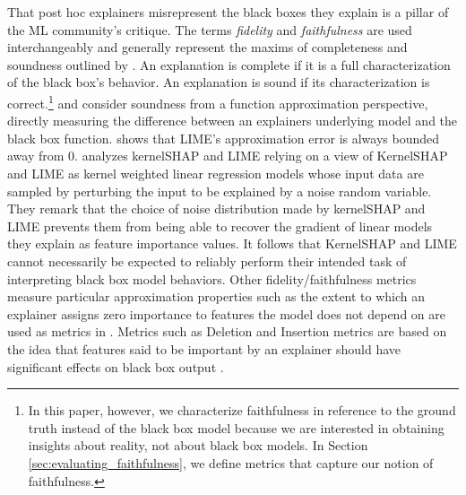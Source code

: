 \documentclass[mnsc,blindrev]{informs3}
\begin{document}
    
        That post hoc explainers misrepresent the black boxes they explain is a pillar of the ML community's critique. The terms \emph{fidelity} and \emph{faithfulness} are used interchangeably and generally represent the maxims of completeness and soundness outlined by \citep{zhou21evaluating}. An explanation is complete if it is a full characterization of the black box's behavior. An explanation is sound if its characterization is correct.\footnote{In this paper, however, we characterize faithfulness in reference to the ground truth instead of the black box model because we are interested in obtaining insights about reality, not about black box models. In Section \ref{sec:evaluating_faithfulness}, we define metrics that capture our notion of faithfulness.} 
    \cite{garreau2020looking} and \cite{han22which} consider soundness from a function approximation perspective, directly measuring the difference between an explainers underlying model and the black box function. \cite{garreau2020looking} shows that LIME's approximation error is always bounded away from 0. \cite{han22which} analyzes kernelSHAP and LIME relying on a view of KernelSHAP and LIME as kernel weighted linear regression models whose input data are sampled by perturbing the input to be explained by a noise random variable. They remark that the choice of noise distribution made by kernelSHAP and LIME prevents them from being able to recover the gradient of linear models they explain as feature importance values. It follows that KernelSHAP and LIME cannot necessarily be expected to reliably perform their intended task of interpreting black box model behaviors. 
Other fidelity/faithfulness metrics measure particular approximation properties such as the extent to which an explainer assigns zero importance to features the model does not depend on are used as metrics in \cite{nguyen2020quantitative}. Metrics such as Deletion and Insertion metrics are based on the idea that features said to be important by an explainer should have significant effects on black box output \citep{deyoung20eraser,nguyen2020quantitative,alvarez18robustness,luss2021leveraging}.
    
\end{document}
